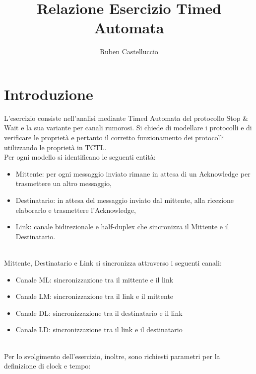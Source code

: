 \documentclass{article}
\title{Relazione Esercizio Timed Automata}
\author{Ruben Castelluccio}
\begin{document}
\maketitle

\section{Introduzione}
L'esercizio consiste nell'analisi mediante Timed Automata del protocollo Stop \& Wait e la sua variante per canali rumorosi. Si chiede di modellare i protocolli e di verificare le proprietà e pertanto il corretto funzionamento dei protocolli utilizzando le proprietà in TCTL.
\\Per ogni modello si identificano le seguenti entità:
\begin{itemize}
\item Mittente: per ogni messaggio inviato rimane in attesa di un Acknowledge per trasmettere un altro messaggio,
\item Destinatario: in attesa del messaggio inviato dal mittente, alla ricezione elaborarlo e trasmettere l'Acknowledge,
\item Link: canale bidirezionale e half-duplex che sincronizza il Mittente e il Destinatario.
\end{itemize}
\\Mittente, Destinatario e Link si sincronizza attraverso i seguenti canali:
\begin{itemize}
    \item Canale ML: sincronizzazione tra il mittente e il link
    \item Canale LM: sincronizzazione tra il link e il mittente
    \item Canale DL: sincronizzazione tra il destinatario e il link
    \item Canale LD: sincronizzazione tra il link e il destinatario
\end{itemize}
\\Per lo svolgimento dell'esercizio, inoltre, sono richiesti parametri per la definizione di clock e tempo:
\end{document}
